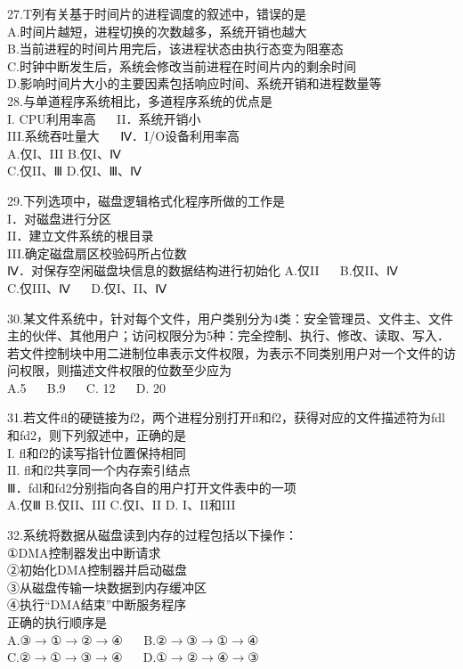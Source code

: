 27.T列有关基于时间片的进程调度的叙述中，错误的是 \\
A.时间片越短，进程切换的次数越多，系统开销也越大 \\
B.当前进程的时间片用完后，该进程状态由执行态变为阻塞态 \\
C.时钟中断发生后，系统会修改当前进程在时间片内的剩余时间 \\
D.影响时间片大小的主要因素包括响应时间、系统开销和进程数量等 \\

28.与单道程序系统相比，多道程序系统的优点是 \\
I. CPU利用率高  $\quad$  II．系统开销小 \\
III.系统吞吐量大  $\quad$  Ⅳ．I/O设备利用率高 \\
A.仅I、III    B.仅I、Ⅳ \\
C.仅II、Ⅲ    D.仅I、Ⅲ、Ⅳ

29.下列选项中，磁盘逻辑格式化程序所做的工作是 \\
I．对磁盘进行分区 \\
II．建立文件系统的根目录 \\
III.确定磁盘扇区校验码所占位数 \\
Ⅳ．对保存空闲磁盘块信息的数据结构进行初始化
A.仅II  $\quad$  B.仅II、Ⅳ \\
C.仅III、Ⅳ  $\quad$  D.仅I、II、Ⅳ

30.某文件系统中，针对每个文件，用户类别分为4类：安全管理员、文件主、文件主的伙伴、其他用户；访问权限分为5种：完全控制、执行、修改、读取、写入．若文件控制块中用二进制位串表示文件权限，为表示不同类别用户对一个文件的访问权限，则描述文件权限的位数至少应为 \\
A.5  $\quad$  B.9  $\quad$  C. 12  $\quad$  D. 20

31.若文件fl的硬链接为f2，两个进程分别打开fl和f2，获得对应的文件描述符为fdl和fd2，则下列叙述中，正确的是 \\
I. fl和f2的读写指针位置保持相同 \\
II. fl和f2共享同一个内存索引结点 \\
Ⅲ．fdl和fd2分别指向各自的用户打开文件表中的一项 \\
A.仅Ⅲ    B.仅II、III    C.仅I、II    D.  I、II和III

32.系统将数据从磁盘读到内存的过程包括以下操作： \\
①DMA控制器发出中断请求 \\
②初始化DMA控制器并启动磁盘 \\
③从磁盘传输一块数据到内存缓冲区 \\
④执行“DMA结束”中断服务程序 \\
正确的执行顺序是 \\
A.③$\rightarrow$①$\rightarrow$②$\rightarrow$④  $\quad$  B.②$\rightarrow$③$\rightarrow$①$\rightarrow$④ \\
C.②$\rightarrow$①$\rightarrow$③$\rightarrow$④  $\quad$  D.①$\rightarrow$②$\rightarrow$④$\rightarrow$③

